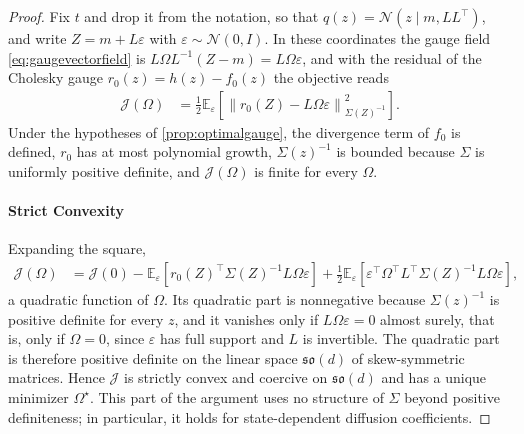 \documentclass{article} %
\newcommand{\priordrift}{h}
\newcommand{\postdrift}{f}
\newcommand{\gauge}{\Omega}
\newcommand{\skewset}{\mathfrak{so}}
\newcommand{\E}{\mathbb{E}}
\newcommand{\Norm}{\mathcal{N}}
\begin{document}
\begin{proof}
Fix $t$ and drop it from the notation, so that $q(z) = \Norm(z \mid m, L L^\top)$, and write $Z = m + L \varepsilon$ with $\varepsilon \sim \Norm(0, I)$. In these coordinates the gauge field \cref{eq:gaugevectorfield} is $L \gauge L^{-1}(Z - m) = L \gauge \varepsilon$, and with the residual of the Cholesky gauge $r_0(z) = \priordrift(z) - \postdrift_0(z)$ the objective reads
\begin{align*}
    \mathcal{J}(\gauge) &= \frac{1}{2} \E_\varepsilon \left[ \left\| r_0(Z) - L \gauge \varepsilon \right\|_{\Sigma(Z)^{-1}}^2 \right].
\end{align*}
Under the hypotheses of \cref{prop:optimalgauge}, the divergence term of $\postdrift_0$ is defined, $r_0$ has at most polynomial growth, $\Sigma(z)^{-1}$ is bounded because $\Sigma$ is uniformly positive definite, and $\mathcal{J}(\gauge)$ is finite for every $\gauge$.

\paragraph{Strict Convexity}
Expanding the square,
\begin{align*}
    \mathcal{J}(\gauge) &= \mathcal{J}(0) - \E_\varepsilon \left[ r_0(Z)^\top \Sigma(Z)^{-1} L \gauge \varepsilon \right] + \frac{1}{2} \E_\varepsilon \left[ \varepsilon^\top \gauge^\top L^\top \Sigma(Z)^{-1} L \gauge \varepsilon \right],
\end{align*}
a quadratic function of $\gauge$. Its quadratic part is nonnegative because $\Sigma(z)^{-1}$ is positive definite for every $z$, and it vanishes only if $L \gauge \varepsilon = 0$ almost surely, that is, only if $\gauge = 0$, since $\varepsilon$ has full support and $L$ is invertible. The quadratic part is therefore positive definite on the linear space $\skewset(d)$ of skew-symmetric matrices. Hence $\mathcal{J}$ is strictly convex and coercive on $\skewset(d)$ and has a unique minimizer $\gauge^\star$. This part of the argument uses no structure of $\Sigma$ beyond positive definiteness; in particular, it holds for state-dependent diffusion coefficients.


\end{proof}
\end{document}
